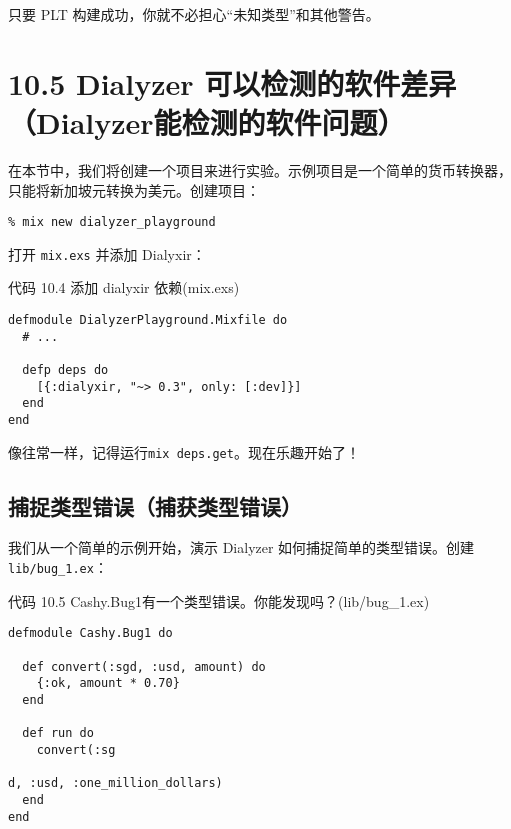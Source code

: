 只要 PLT 构建成功，你就不必担心``未知类型''和其他警告。


\section{10.5 Dialyzer 可以检测的软件差异（Dialyzer能检测的软件问题）}

在本节中，我们将创建一个项目来进行实验。示例项目是一个简单的货币转换器，只能将新加坡元转换为美元。创建项目：

\begin{code}{}\begin{verbatim}
% mix new dialyzer_playground
\end{verbatim}
\end{code}

打开 \texttt{mix.exs} 并添加 Dialyxir：


\begin{code}{代码 10.4 添加 dialyxir 依赖(mix.exs)}

\begin{verbatim}
defmodule DialyzerPlayground.Mixfile do
  # ...

  defp deps do
    [{:dialyxir, "~> 0.3", only: [:dev]}]
  end
end
\end{verbatim}
\end{code}

像往常一样，记得运行\texttt{mix deps.get}。现在乐趣开始了！


\subsection{捕捉类型错误（捕获类型错误）}

我们从一个简单的示例开始，演示 Dialyzer 如何捕捉简单的类型错误。创建
\texttt{lib/bug\_1.ex}：

\begin{code}{代码 10.5 Cashy.Bug1有一个类型错误。你能发现吗？(lib/bug\_1.ex)}

\begin{verbatim}
defmodule Cashy.Bug1 do

  def convert(:sgd, :usd, amount) do
    {:ok, amount * 0.70}
  end

  def run do
    convert(:sg

d, :usd, :one_million_dollars)
  end
end
\end{verbatim}
\end{code}

